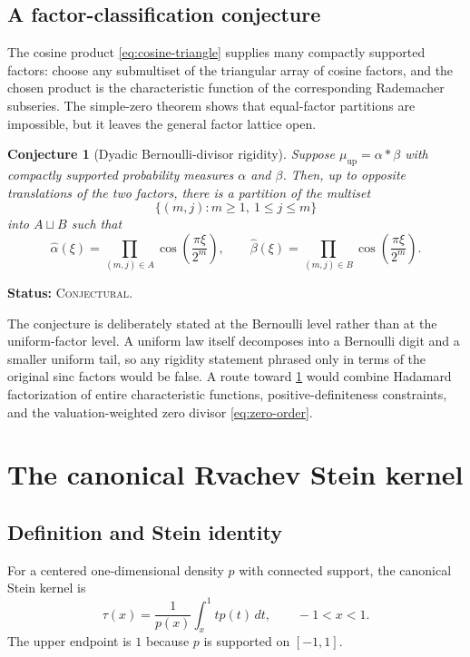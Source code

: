\documentclass[11pt,oneside]{article}
\newtheorem{conjecture}[theorem]{Conjecture}
\theoremstyle{definition}
\theoremstyle{remark}
\newcommand{\Up}{\operatorname{up}}
\newcommand{\Conjectural}{\textcolor{statusred}{\textsc{Conjectural}}}
\newcommand{\Status}[1]{\par\smallskip\noindent\textbf{Status:} #1.\par\smallskip}
\begin{document}
\subsection{A factor-classification conjecture}
The cosine product \eqref{eq:cosine-triangle} supplies many compactly supported
factors: choose any submultiset of the triangular array of cosine factors, and the
chosen product is the characteristic function of the corresponding Rademacher
subseries.  The simple-zero theorem shows that equal-factor partitions are
impossible, but it leaves the general factor lattice open.

\begin{conjecture}[Dyadic Bernoulli-divisor rigidity]\label{conj:factor-rigidity}
Suppose $\mu_{\Up}=\alpha*\beta$ with compactly supported probability measures
$\alpha$ and $\beta$.  Then, up to opposite translations of the two factors,
there is a partition of the multiset
\[
 \{(m,j):m\ge1,\ 1\le j\le m\}
\]
into $A\sqcup B$ such that
\[
 \widehat\alpha(\xi)=\prod_{(m,j)\in A}
 \cos\!\left(\frac{\pi\xi}{2^m}\right),\qquad
 \widehat\beta(\xi)=\prod_{(m,j)\in B}
 \cos\!\left(\frac{\pi\xi}{2^m}\right).
\]
\end{conjecture}
\Status{\Conjectural}

The conjecture is deliberately stated at the Bernoulli level rather than at the
uniform-factor level.  A uniform law itself decomposes into a Bernoulli digit and
a smaller uniform tail, so any rigidity statement phrased only in terms of the
original sinc factors would be false.  A route toward \cref{conj:factor-rigidity}
would combine Hadamard factorization of entire characteristic functions,
positive-definiteness constraints, and the valuation-weighted zero divisor
\eqref{eq:zero-order}.

\section{The canonical Rvachev Stein kernel}

\subsection{Definition and Stein identity}
For a centered one-dimensional density $p$ with connected support, the canonical
Stein kernel is
\begin{equation}\label{eq:stein-def}
 \tau(x)=\frac{1}{p(x)}\int_x^1 t p(t)\,dt,
 \qquad -1<x<1.
\end{equation}
The upper endpoint is $1$ because $p$ is supported on $[-1,1]$.
\end{document}
